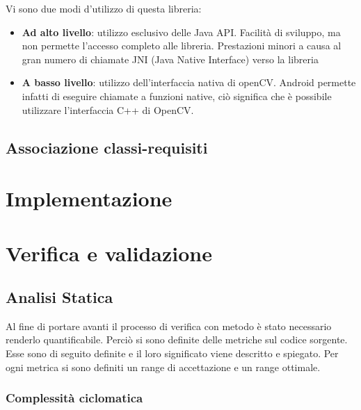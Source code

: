 Vi sono due modi d'utilizzo di questa libreria:

\begin{itemize}
\item \textbf{Ad alto livello}:  utilizzo esclusivo delle Java API. Facilità di sviluppo, ma non permette l'accesso completo alle libreria. Prestazioni minori a causa al gran numero di chiamate JNI (Java Native Interface) verso la libreria

\item \textbf{A basso livello}:  utilizzo dell'interfaccia nativa di openCV. Android permette infatti di eseguire chiamate a funzioni native, ciò significa che è possibile utilizzare l'interfaccia C++ di OpenCV. 
\end{itemize}





\subsection{Associazione classi-requisiti}


\section{Implementazione}




\section{Verifica e validazione}

\subsection{Analisi Statica}
Al fine di portare avanti il processo di verifica con metodo è stato necessario renderlo
quantificabile. Perciò si sono definite delle metriche sul codice sorgente. Esse sono
di seguito definite e il loro significato viene descritto e spiegato. Per ogni metrica si
sono definiti un range di accettazione e un range ottimale.

\subsubsection{Complessità ciclomatica}

